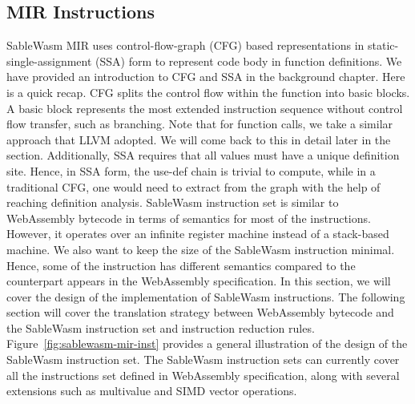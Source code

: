 \subsection{MIR Instructions}

SableWasm MIR uses control-flow-graph (CFG) based representations in static-single-assignment (SSA) form to represent code body in function definitions. We have provided an introduction to CFG and SSA in the background chapter. Here is a quick recap. CFG splits the control flow within the function into basic blocks. A basic block represents the most extended instruction sequence without control flow transfer, such as branching. Note that for function calls, we take a similar approach that LLVM adopted. We will come back to this in detail later in the section. Additionally, SSA requires that all values must have a unique definition site. Hence, in SSA form, the use-def chain is trivial to compute, while in a traditional CFG, one would need to extract from the graph with the help of reaching definition analysis. SableWasm instruction set is similar to WebAssembly bytecode in terms of semantics for most of the instructions. However, it operates over an infinite register machine instead of a stack-based machine. We also want to keep the size of the SableWasm instruction minimal. Hence, some of the instruction has different semantics compared to the counterpart appears in the WebAssembly specification. In this section, we will cover the design of the implementation of SableWasm instructions. The following section will cover the translation strategy between WebAssembly bytecode and the SableWasm instruction set and instruction reduction rules.  Figure~\ref{fig:sablewasm-mir-inst} provides a general illustration of the design of the SableWasm instruction set. The SableWasm instruction sets can currently cover all the instructions set defined in WebAssembly specification, along with several extensions such as multivalue and SIMD vector operations.

